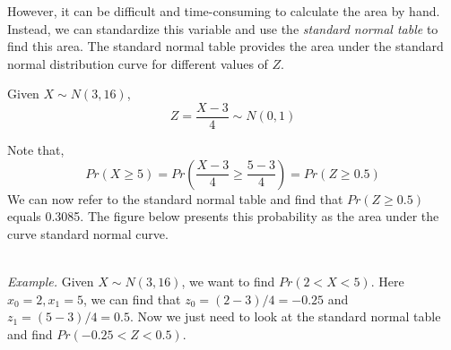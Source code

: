 \documentclass{./../../Latex/handout}
\begin{document}
However, it can be difficult and time-consuming to calculate the area by hand. Instead, we can standardize this variable and use the \textit{standard normal table} to find this area. The standard normal table provides the area under the standard normal distribution curve for different values of $Z$. 

Given $X \sim N(3, 16)$, 
$$ Z = \frac{X-3}{4} \sim N(0,1) $$

Note that, 
  $$ Pr(X \geq 5) = Pr\left(\frac{X-3}{4} \geq \frac{5-3}{4}\right) = Pr(Z \geq 0.5)  $$
 We can now refer to the standard normal table and find that $Pr(Z \geq 0.5)$ equals 0.3085. The figure below presents this probability as the area under the curve standard normal curve. \\

 \begin{figure}[!h]
 \centering	
{}
 \end{figure}


 \\ 

\textit{Example.} Given $X \sim N(3, 16)$, we want to find $Pr(2<X<5)$. Here $x_0 = 2, x_1=5$, we can find that  $z_0 = (2-3)/4=-0.25$ and $z_1=(5-3)/4=0.5$. Now we just need to look at the standard normal table and find $Pr(-0.25<Z<0.5)$.
\end{document}
